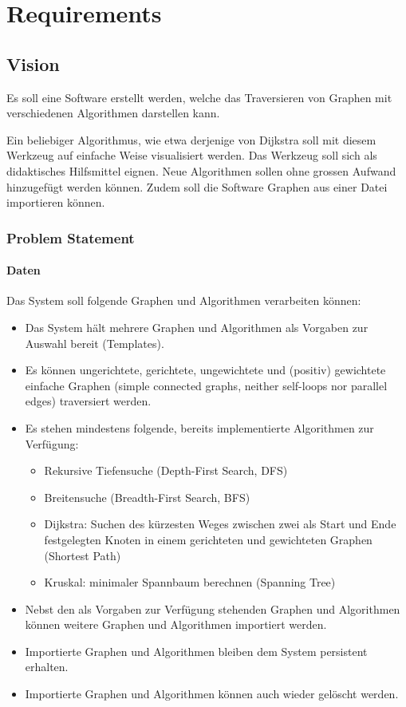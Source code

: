 \chapter{Requirements}
% 
\section{Vision}
\label{sec:Vision}
Es soll eine Software erstellt werden, welche das Traversieren von Graphen mit verschiedenen Algorithmen darstellen kann. 

Ein beliebiger Algorithmus, wie etwa derjenige von Dijkstra soll mit diesem Werkzeug auf einfache Weise visualisiert werden. Das Werkzeug soll sich als didaktisches Hilfsmittel eignen. Neue Algorithmen sollen ohne grossen Aufwand hinzugef\"ugt werden k\"onnen. Zudem soll die Software Graphen aus einer Datei importieren k\"onnen.
% 
\subsection{Problem Statement}
\label{subsec:Problem Statement}
% 
\subsubsection{Daten}
\label{subsubsec:Daten}
Das System soll folgende Graphen und Algorithmen verarbeiten k\"onnen:
\begin{itemize}
    \item Das System h\"alt mehrere Graphen und Algorithmen als Vorgaben zur Auswahl bereit (Templates).
    \item Es k\"onnen ungerichtete, gerichtete, ungewichtete und (positiv) gewichtete einfache Graphen (simple connected graphs, neither self-loops nor parallel edges) traversiert werden.
    \item Es stehen mindestens folgende, bereits implementierte Algorithmen zur Verf\"ugung:
  \begin{itemize}
    \item Rekursive Tiefensuche (Depth-First Search, DFS)
    \item Breitensuche (Breadth-First Search, BFS)
    \item Dijkstra: Suchen des k\"urzesten Weges zwischen zwei als Start und Ende festgelegten Knoten in einem gerichteten und gewichteten Graphen (Shortest Path)
    \item Kruskal: minimaler Spannbaum berechnen (Spanning Tree)
  \end{itemize}
  \item Nebst den als Vorgaben zur Verf\"ugung stehenden Graphen und Algorithmen k\"onnen weitere Graphen und Algorithmen importiert werden.
  \item Importierte Graphen und Algorithmen bleiben dem System persistent erhalten.
  \item Importierte Graphen und Algorithmen k\"onnen auch wieder gel\"oscht werden.
\end{itemize}
% 
